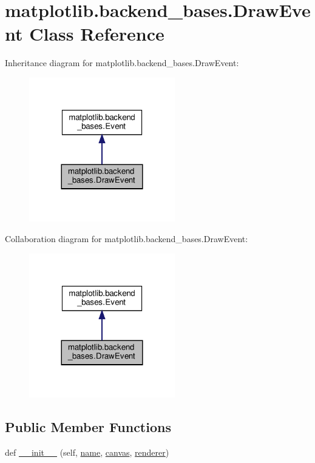 \hypertarget{classmatplotlib_1_1backend__bases_1_1DrawEvent}{}\section{matplotlib.\+backend\+\_\+bases.\+Draw\+Event Class Reference}
\label{classmatplotlib_1_1backend__bases_1_1DrawEvent}


Inheritance diagram for matplotlib.\+backend\+\_\+bases.\+Draw\+Event\+:
\nopagebreak
\begin{figure}[H]
\begin{center}
\leavevmode
\includegraphics[width=180pt]{classmatplotlib_1_1backend__bases_1_1DrawEvent__inherit__graph}
\end{center}
\end{figure}


Collaboration diagram for matplotlib.\+backend\+\_\+bases.\+Draw\+Event\+:
\nopagebreak
\begin{figure}[H]
\begin{center}
\leavevmode
\includegraphics[width=180pt]{classmatplotlib_1_1backend__bases_1_1DrawEvent__coll__graph}
\end{center}
\end{figure}
\subsection*{Public Member Functions}
\begin{DoxyCompactItemize}
\item 
def \hyperlink{classmatplotlib_1_1backend__bases_1_1DrawEvent_aedf520abb31386ce4d87ea9f076cae4c}{\+\_\+\+\_\+init\+\_\+\+\_\+} (self, \hyperlink{classmatplotlib_1_1backend__bases_1_1Event_a4b10ea7af7c8a0b20bcdbb9ca03e1654}{name}, \hyperlink{classmatplotlib_1_1backend__bases_1_1Event_a7721d867d81a1255b1aeb51babec4e14}{canvas}, \hyperlink{classmatplotlib_1_1backend__bases_1_1DrawEvent_ae702afe085dcd8aa2fbd6b1ac80a10d3}{renderer})
\end{DoxyCompactItemize}
